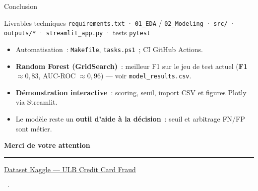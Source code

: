 \documentclass[aspectratio=169,11pt]{beamer}
\begin{document}
\begin{frame}{Conclusion}
  \begin{block}{Livrables techniques}
    \small
    \texttt{requirements.txt} · \texttt{01\_EDA} / \texttt{02\_Modeling} · \texttt{src/} · \texttt{outputs/*} · \texttt{streamlit\_app.py} · tests \texttt{pytest}
  \end{block}
  \vspace{0.5em}
  \begin{itemize}
    \item Automatisation~: \texttt{Makefile}, \texttt{tasks.ps1}~; CI GitHub Actions.
    \item \textbf{Random Forest (GridSearch)}~: meilleur F1 sur le jeu de test actuel (\textbf{F1 $\approx 0{,}83$}, AUC-ROC $\approx 0{,}96$) — voir \texttt{model\_results.csv}.
    \item \textbf{Démonstration interactive}~: scoring, seuil, import CSV et figures Plotly via Streamlit.
    \item Le modèle reste un \textbf{outil d'aide à la décision}~: seuil et arbitrage FN/FP sont métier.
  \end{itemize}
\end{frame}

\begin{frame}[plain]
  \vspace*{2.0cm}
  \centering
  {\LARGE\bfseries\color{white}Merci de votre attention}\par
  \vspace{1.2em}
  \textcolor{white!50}{\rule{0.20\linewidth}{0.6pt}}\par
  \vspace{1.0em}
  \href{https://www.kaggle.com/datasets/mlg-ulb/creditcardfraud}{%
    \textcolor{MLAccent!70}{\small Dataset Kaggle --- ULB Credit Card Fraud}%
  }\par
  \vspace{0.6em}
  {\small\textcolor{white!60}{\insertauthor\ $\cdot$\ \insertinstitute}}
\end{frame}
\end{document}
